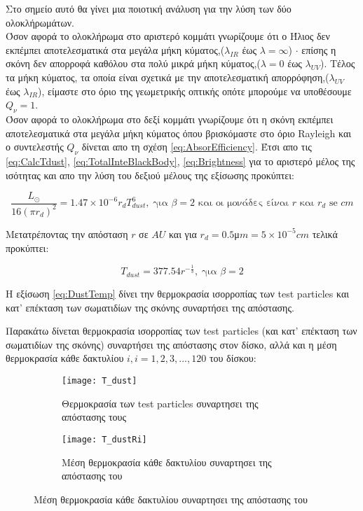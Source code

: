 Στο σημείο αυτό θα γίνει μια ποιοτική ανάλυση για την λύση των δύο ολοκλήρωμάτων.\\
Όσον αφορά το ολοκλήρωμα στο αριστερό κομμάτι γνωρίζουμε ότι ο Ήλιος δεν εκπέμπει αποτελεσματικά στα μεγάλα μήκη κύματος,($\lambda_{IR}$ έως $\lambda = \infty$) $\cdot$ επίσης η σκόνη δεν απορροφά καθόλου στα πολύ μικρά μήκη κύματος,($\lambda = 0$ έως $\lambda_{UV}$). Τέλος τα μήκη κύματος, τα οποία είναι σχετικά με την αποτελεσματική απορρόφηση,($\lambda_{UV}$ έως $\lambda_{IR}$), είμαστε στο όριο της γεωμετρικής οπτικής οπότε μπορούμε να υποθέσουμε $Q_{\nu}=1$.\\
Όσον αφορά το ολοκλήρωμα στο δεξί κομμάτι γνωρίζουμε ότι η σκόνη εκπέμπει αποτελεσματικά στα μεγάλα μήκη κύματος όπου βρισκόμαστε στο όριο {\en Rayleigh} και ο συντελεστής $Q_{\nu}$ δίνεται απο τη σχέση \eqref{eq:AbsorEfficiency}.
Έτσι απο τις \eqref{eq:CalcTdust}, \eqref{eq:TotalInteBlackBody}, \eqref{eq:Brightness} για το αριστερό μέλος της ισότητας και απο την λύση του δεξιού μέλους της εξίσωσης\cite[{\en Chap.~8, Sect.~2.2}]{krugel2002physics} προκύπτει:

\begin{equation}
\frac{L_\odot}{16 (\pi r_d)^2} = 1.47\times10^{-6} r_d T_{dust}^6, \; \text{για $\beta=2$ και οι μονάδες είναι $r$ και $r_d$ se $cm$} 
\end{equation}

Μετατρέποντας την απόσταση $r$ σε $AU$ και για $r_d = 0.5$μ$m =5\times10^{-5} cm$ τελικά προκύπτει:

\begin{equation}\label{eq:DustTemp}
T_{dust} = 377.54 r^{- \frac{1}3}, \; \text{για $\beta=2$} 
\end{equation}

Η εξίσωση \eqref{eq:DustTemp} δίνει την θερμοκρασία ισορροπίας των {\en test particles} και κατ' επέκταση των σωματιδίων της σκόνης συναρτήσει της απόστασης.

\newpage
Παρακάτω δίνεται θερμοκρασία ισορροπίας των {\en test particles} (και κατ' επέκταση των σωματιδίων της σκόνης) συναρτήσει της απόστασης στον δίσκο, αλλά και η μέση θερμοκρασία κάθε δακτυλίου $i, i=1,2,3,...,120$ του δίσκου:

\begin{figure}[h]
\centering
 \begin{subfigure}{0.48\textwidth}
  \texttt{[image: T\_dust]}
  \caption{Θερμοκρασία των {\en test particles} συναρτησει της απόστασης τους}\label{fig:TPTemp}
 \end{subfigure}\hfill
 \begin{subfigure}{0.48\textwidth}
  \centering
  \texttt{[image: T\_dustRi]}
  \caption{Μέση θερμοκρασία κάθε δακτυλίου συναρτησει της απόστασης του}\label{fig:DiscTemp}
 \end{subfigure}
\end{figure}

